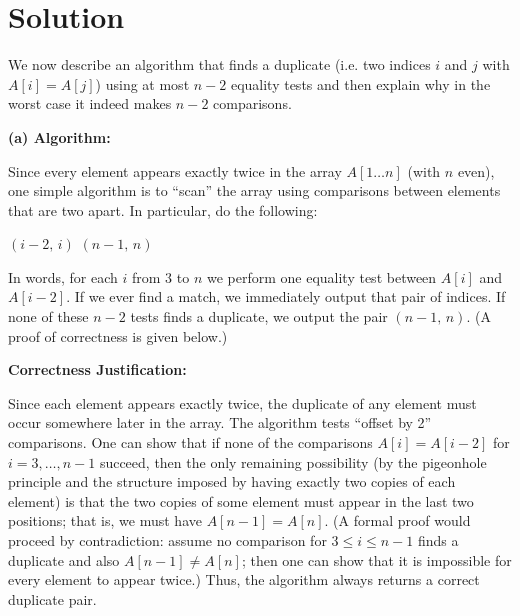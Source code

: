 \documentclass[11pt]{article}
\begin{document}
    \section*{Solution}

    We now describe an algorithm that finds a duplicate (i.e. two indices \(i\) and \(j\) with \(A[i] = A[j]\)) using at most \(n-2\) equality tests and then explain why in the worst case it indeed makes \(n-2\) comparisons.
    
    \bigskip
    
    \textbf{(a) Algorithm:}
    
    Since every element appears exactly twice in the array \(A[1 \ldots n]\) (with \(n\) even), one simple algorithm is to “scan” the array using comparisons between elements that are two apart. In particular, do the following:
    
    \begin{algorithmic}[1]
            \State \Return \((i-2,\, i)\)
        \EndIf
    \EndFor
    \State \Return \((n-1,\, n)\)
    \end{algorithmic}
    
    \medskip
    
    In words, for each \(i\) from \(3\) to \(n\) we perform one equality test between \(A[i]\) and \(A[i-2]\). If we ever find a match, we immediately output that pair of indices. If none of these \(n-2\) tests finds a duplicate, we output the pair \((n-1,\, n)\). (A proof of correctness is given below.)
    
    \medskip
    
    \textbf{Correctness Justification:}
    
    Since each element appears exactly twice, the duplicate of any element must occur somewhere later in the array. The algorithm tests “offset by 2” comparisons. One can show that if none of the comparisons \(A[i] = A[i-2]\) for \(i=3,\ldots,n-1\) succeed, then the only remaining possibility (by the pigeonhole principle and the structure imposed by having exactly two copies of each element) is that the two copies of some element must appear in the last two positions; that is, we must have \(A[n-1]=A[n]\). (A formal proof would proceed by contradiction: assume no comparison for \(3\le i\le n-1\) finds a duplicate and also \(A[n-1] \neq A[n]\); then one can show that it is impossible for every element to appear twice.) Thus, the algorithm always returns a correct duplicate pair.
    
\end{document}
